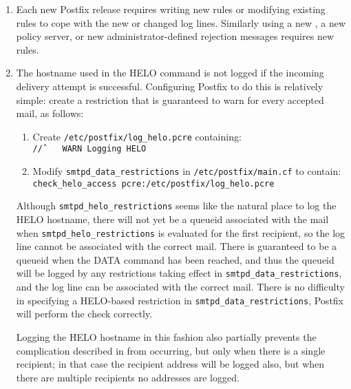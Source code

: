 \label{logging helo}

\begin{enumerate}

    \item Each new Postfix release requires writing new rules or modifying
        existing rules to cope with the new or changed log lines.
        Similarly using a new , a new policy server, or new
        administrator-defined rejection messages requires new rules.

    \item The hostname used in the HELO command is not logged if the
        incoming delivery attempt is successful.  Configuring Postfix to do
        this is relatively simple: create a restriction that is guaranteed
        to warn for every accepted mail, as follows:

        \begin{enumerate}

            \item Create \texttt{/etc/postfix/log\_helo.pcre}
                containing:\newline{}
                \tab{}\texttt{/\^/~~~~WARN~Logging~HELO}

            \item Modify \texttt{smtpd\_data\_restrictions} in
                \texttt{/etc/postfix/main.cf} to contain:\newline{}
                \tab{}\texttt{check\_helo\_access~pcre:/etc/postfix/log\_helo.pcre}

        \end{enumerate}

        Although \texttt{smtpd\_helo\_restrictions} seems like the natural
        place to log the HELO hostname, there will not yet be a queueid
        associated with the mail when \texttt{smtpd\_helo\_restrictions} is
        evaluated for the first recipient, so the log line cannot be
        associated with the correct mail.  There is guaranteed to be a
        queueid when the DATA command has been reached, and thus the
        queueid will be logged by any restrictions taking effect in
        \texttt{smtpd\_data\_restrictions}, and the log line can be
        associated with the correct mail.  There is no difficulty in
        specifying a HELO-based restriction in
        \texttt{smtpd\_data\_restrictions}, Postfix will perform the check
        correctly.

        Logging the HELO hostname in this fashion also partially prevents
        the complication described in  from occurring, but only when there is a
        single recipient; in that case the recipient address will be logged
        also, but when there are multiple recipients no addresses are
        logged.


\end{enumerate}
